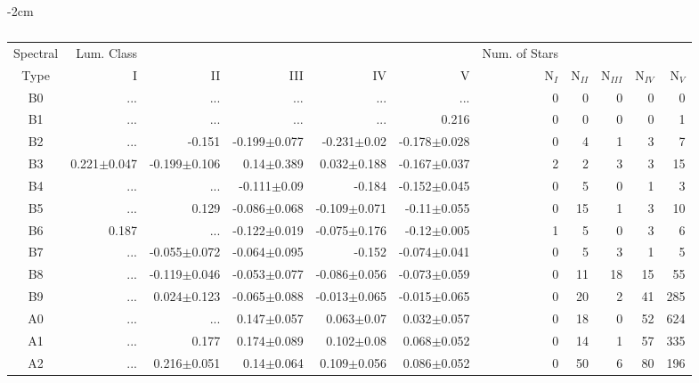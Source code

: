 \begin{table}[t]
\caption{Colors of Michigan Spectral Atlases}
    \begin{table}[t]
    \tiny
    \centering
    \caption{\jwtwo}
    \begin{center}
        \addtolength{\leftskip} {-2cm}
        \addtolength{\rightskip}{-2cm}
        \begin{tabular}{c|rrrrr|rrrrr}
        \toprule
        Spectral & Lum. Class & & & & & Num. of Stars & & & &  \\
        Type & I & II & III &  IV & V & N$_{I}$ & N$_{II}$ & N$_{III}$ & N$_{IV}$ & N$_{V}$ \\ \midrule
          
        B0	&	 ...	&	 ...	&	 ...	&	 ...	&	 ...	&	0	&	0	&	0	&	0	&	0	\\
        B1	&	 ...	&	 ...	&	 ...	&	 ...	&	0.216	&	0	&	0	&	0	&	0	&	1	\\
        B2	&	 ...	&	-0.151	&	-0.199$\pm$0.077	&	-0.231$\pm$0.02	&	-0.178$\pm$0.028	&	0	&	4	&	1	&	3	&	7	\\
        B3	&	0.221$\pm$0.047	&	-0.199$\pm$0.106	&	0.14$\pm$0.389	&	0.032$\pm$0.188	&	-0.167$\pm$0.037	&	2	&	2	&	3	&	3	&	15	\\
        B4	&	 ...	&	 ...	&	-0.111$\pm$0.09	&	-0.184	&	-0.152$\pm$0.045	&	0	&	5	&	0	&	1	&	3	\\
        B5	&	 ...	&	0.129	&	-0.086$\pm$0.068	&	-0.109$\pm$0.071	&	-0.11$\pm$0.055	&	0	&	15	&	1	&	3	&	10	\\
        B6	&	0.187	&	 ...	&	-0.122$\pm$0.019	&	-0.075$\pm$0.176	&	-0.12$\pm$0.005	&	1	&	5	&	0	&	3	&	6	\\
        B7	&	 ...	&	-0.055$\pm$0.072	&	-0.064$\pm$0.095	&	-0.152	&	-0.074$\pm$0.041	&	0	&	5	&	3	&	1	&	5	\\
        B8	&	 ...	&	-0.119$\pm$0.046	&	-0.053$\pm$0.077	&	-0.086$\pm$0.056	&	-0.073$\pm$0.059	&	0	&	11	&	18	&	15	&	55	\\
        B9	&	 ...	&	0.024$\pm$0.123	&	-0.065$\pm$0.088	&	-0.013$\pm$0.065	&	-0.015$\pm$0.065	&	0	&	20	&	2	&	41	&	285	\\
        A0	&	 ...	&	 ...	&	0.147$\pm$0.057	&	0.063$\pm$0.07	&	0.032$\pm$0.057	&	0	&	18	&	0	&	52	&	624	\\
        A1	&	 ...	&	0.177	&	0.174$\pm$0.089	&	0.102$\pm$0.08	&	0.068$\pm$0.052	&	0	&	14	&	1	&	57	&	335	\\
        A2	&	 ...	&	0.216$\pm$0.051	&	0.14$\pm$0.064	&	0.109$\pm$0.056	&	0.086$\pm$0.052	&	0	&	50	&	6	&	80	&	196	\\

\end{tabular}
\end{center}
\end{table}
\end{table}
